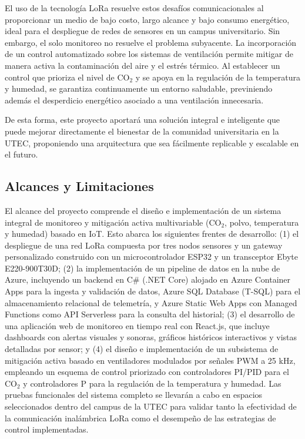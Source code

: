 El uso de la tecnología LoRa resuelve estos desafíos comunicacionales al proporcionar un medio de bajo costo, largo alcance y bajo consumo energético, ideal para el despliegue de redes de sensores en un campus universitario. Sin embargo, el solo monitoreo no resuelve el problema subyacente. La incorporación de un control automatizado sobre los sistemas de ventilación permite mitigar de manera activa la contaminación del aire y el estrés térmico. Al establecer un control que prioriza el nivel de CO\(_2\) y se apoya en la regulación de la temperatura y humedad, se garantiza continuamente un entorno saludable, previniendo además el desperdicio energético asociado a una ventilación innecesaria.

De esta forma, este proyecto aportará una solución integral e inteligente que puede mejorar directamente el bienestar de la comunidad universitaria en la UTEC, proponiendo una arquitectura que sea fácilmente replicable y escalable en el futuro.


\subsection*{Alcances y Limitaciones}

El alcance del proyecto comprende el diseño e implementación de un sistema integral de monitoreo y mitigación activa multivariable (CO\(_2\), polvo, temperatura y humedad) basado en IoT. Esto abarca los siguientes frentes de desarrollo: (1) el despliegue de una red LoRa compuesta por tres nodos sensores y un gateway personalizado construido con un microcontrolador ESP32 y un transceptor Ebyte E220-900T30D; (2) la implementación de un pipeline de datos en la nube de Azure, incluyendo un backend en C\# (.NET Core) alojado en Azure Container Apps para la ingesta y validación de datos, Azure SQL Database (T-SQL) para el almacenamiento relacional de telemetría, y Azure Static Web Apps con Managed Functions como API Serverless para la consulta del historial; (3) el desarrollo de una aplicación web de monitoreo en tiempo real con React.js, que incluye dashboards con alertas visuales y sonoras, gráficos históricos interactivos y vistas detalladas por sensor; y (4) el diseño e implementación de un subsistema de mitigación activa basado en ventiladores modulados por señales PWM a 25 kHz, empleando un esquema de control priorizado con controladores PI/PID para el CO\(_2\) y controladores P para la regulación de la temperatura y humedad. Las pruebas funcionales del sistema completo se llevarán a cabo en espacios seleccionados dentro del campus de la UTEC para validar tanto la efectividad de la comunicación inalámbrica LoRa como el desempeño de las estrategias de control implementadas.

